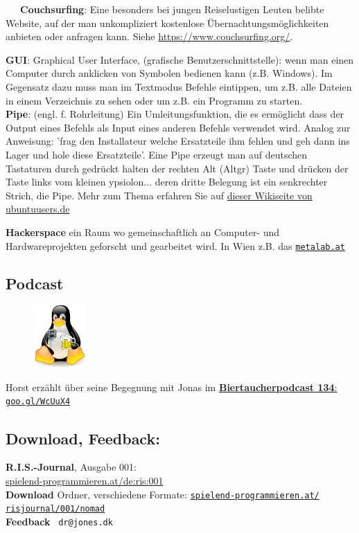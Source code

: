 ~~~\textbf{Couchsurfing}: Eine besonders bei jungen Reiselustigen Leuten belibte Website, auf der man unkompliziert kostenlose Übernachtungsmöglichkeiten anbieten oder anfragen kann. Siehe \url{https://www.couchsurfing.org/}.

\textbf{GUI}: Graphical User Interface, (grafische Benutzerschnittstelle): wenn man einen Computer durch anklicken von Symbolen bedienen kann (z.B. Windows). Im Gegensatz dazu muss man im Textmodus Befehle eintippen, um z.B. alle Dateien in einem Verzeichnis zu sehen oder um z.B. ein Programm zu starten. \\

\textbf{Pipe}: (engl. f. Rohrleitung) Ein Umleitungsfunktion, die es ermöglicht dass der Output eines Befehls als Input eines anderen Befehls verwendet wird. Analog zur Anweisung: 'frag den Installateur welche Ersatzteile ihm fehlen und geh dann ins Lager und hole diese Ersatzteile'. Eine Pipe erzeugt man auf deutschen Tastaturen durch gedrückt halten der rechten Alt (Altgr) Taste und drücken der Taste links vom kleinen ypsiolon... deren dritte Belegung ist ein senkrechter Strich, die Pipe. Mehr zum Thema erfahren Sie auf \href{http://wiki.ubuntuusers.de/Shell/Umleitungen}{dieser Wikiseite von ubuntuusers.de} 

\textbf{Hackerspace} ein Raum wo gemeinschaftlich an Computer- und Hardwareprojekten geforscht und gearbeitet wird. In Wien z.B. das \href{http://metalab.at}{\texttt{metalab.at}} 

\subsection*{Podcast}
\begin{figure}
\includegraphics[width=2cm]{nomad/biertaucherlogo.png}
\end{figure}
Horst erzählt über seine Begegnung mit Jonas im  \href{http://spielend-programmieren.at/de:podcast:biertaucher:2013:134}{\textbf{Biertaucherpodcast 134}: \texttt{goo.gl/WcUuX4}}

\subsection*{Download, Feedback:}
\textbf{R.I.S.-Journal}, Ausgabe 001: \\
\href{http://spielend-programmieren.at/de:ris:001}{spielend-programmieren.at/de:ris:001}\\
\textbf{Download} Ordner, verschiedene Formate: \href{http://spielend-programmieren.at/risjournal/001/nomad}{\texttt{spielend-programmieren.at/\\risjournal/001/nomad}} \\
\textbf{Feedback} \Letter\ \texttt{dr@jones.dk} \\


